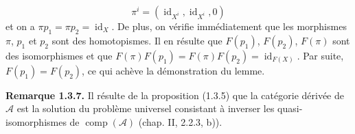 \begin{equation}
\pi^i=(\operatorname{id}_{X^i},\operatorname{id}_{X^i},0)
\tag{1.3.6.3}
\end{equation}
et on a $\pi p_1=\pi p_2=\operatorname{id}_X$. De plus, on vérifie
immédiatement que les morphismes $\pi$, $p_1$ et $p_2$ sont des
homotopismes. Il en résulte que $F(p_1)$, $F(p_2)$, $F(\pi)$ sont des
isomorphismes et que
$F(\pi)F(p_1)=F(\pi)F(p_2)=\operatorname{id}_{F(X)}$. Par suite,
$F(p_1)=F(p_2)$, ce qui achève la démonstration du lemme.

\medskip\noindent\textbf{Remarque 1.3.7.}\quad
Il résulte de la proposition (1.3.5) que la catégorie dérivée de
$\mathcal A$ est la solution du problème universel consistant à inverser
les quasi-isomorphismes de $\operatorname{comp}(\mathcal A)$ (chap. II,
2.2.3, b)).
\endgroup
